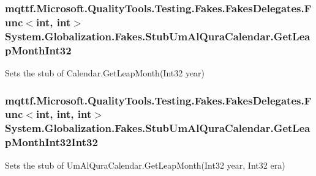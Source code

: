 \hypertarget{class_system_1_1_globalization_1_1_fakes_1_1_stub_um_al_qura_calendar_a9d9cb0d1a5225c96a24d2569b2e5f48c}{
\subsubsection[{Get\-Leap\-Month\-Int32}]{\setlength{\rightskip}{0pt plus 5cm}mqttf.\-Microsoft.\-Quality\-Tools.\-Testing.\-Fakes.\-Fakes\-Delegates.\-Func$<$int, int$>$ System.\-Globalization.\-Fakes.\-Stub\-Um\-Al\-Qura\-Calendar.\-Get\-Leap\-Month\-Int32}}\label{class_system_1_1_globalization_1_1_fakes_1_1_stub_um_al_qura_calendar_a9d9cb0d1a5225c96a24d2569b2e5f48c}


Sets the stub of Calendar.\-Get\-Leap\-Month(\-Int32 year)

\hypertarget{class_system_1_1_globalization_1_1_fakes_1_1_stub_um_al_qura_calendar_a1fcdd621d1f40c85bb54f08119f11fd7}{
\subsubsection[{Get\-Leap\-Month\-Int32\-Int32}]{\setlength{\rightskip}{0pt plus 5cm}mqttf.\-Microsoft.\-Quality\-Tools.\-Testing.\-Fakes.\-Fakes\-Delegates.\-Func$<$int, int, int$>$ System.\-Globalization.\-Fakes.\-Stub\-Um\-Al\-Qura\-Calendar.\-Get\-Leap\-Month\-Int32\-Int32}}\label{class_system_1_1_globalization_1_1_fakes_1_1_stub_um_al_qura_calendar_a1fcdd621d1f40c85bb54f08119f11fd7}


Sets the stub of Um\-Al\-Qura\-Calendar.\-Get\-Leap\-Month(\-Int32 year, Int32 era)

